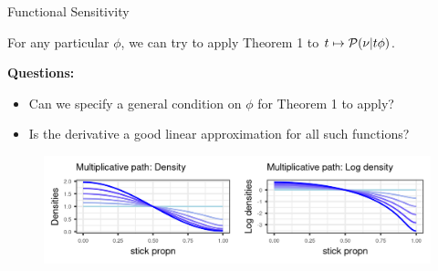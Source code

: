 \begin{frame}{Functional Sensitivity  \citep{gustafson:1996:local}}

For any particular $\phi$, we can try to apply Theorem 1
to $t \mapsto \mathcal{P}(\nu \vert t \phi)$.  
          

 {
{\bf Questions:}
\begin{itemize}
    \item Can we specify a general condition on $\phi$ for
          Theorem 1 to apply?
    \item<4-> Is the derivative a good linear approximation for all
          such functions?
\end{itemize}
}

\begin{figure}[!h]
\centering
\includegraphics[width = 1.0\textwidth]{./figure/mult_path-1.png}
\setlength{\textfloatsep}{-10pt}
\end{figure}


\end{frame}









